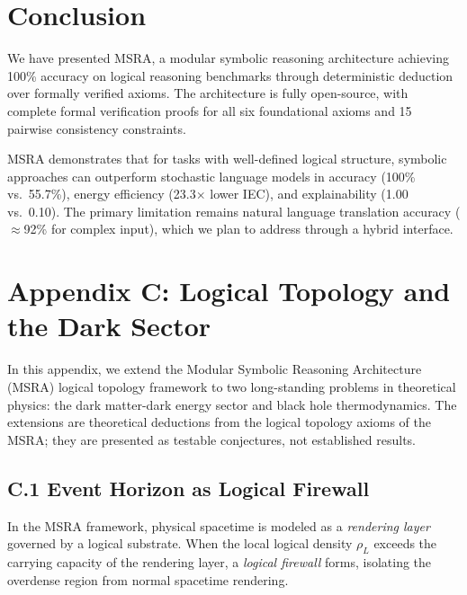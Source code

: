 \documentclass[11pt,a4paper]{article}
\begin{document}
\section{Conclusion}\label{sec:conclusion}

We have presented MSRA, a modular symbolic reasoning architecture achieving 100\% accuracy on logical reasoning benchmarks through deterministic deduction over formally verified axioms. The architecture is fully open-source, with complete formal verification proofs for all six foundational axioms and 15 pairwise consistency constraints.

MSRA demonstrates that for tasks with well-defined logical structure, symbolic approaches can outperform stochastic language models in accuracy (100\% vs.\ 55.7\%), energy efficiency (23.3$\times$ lower IEC), and explainability (1.00 vs.\ 0.10). The primary limitation remains natural language translation accuracy ($\approx$92\% for complex input), which we plan to address through a hybrid interface.

\appendix

\section*{Appendix C: Logical Topology and the Dark Sector}
\label{app:c}

In this appendix, we extend the Modular Symbolic Reasoning Architecture (MSRA) logical topology framework to two long-standing problems in theoretical physics: the dark matter-dark energy sector and black hole thermodynamics. The extensions are theoretical deductions from the logical topology axioms of the MSRA; they are presented as testable conjectures, not established results.

\subsection*{C.1 Event Horizon as Logical Firewall}

In the MSRA framework, physical spacetime is modeled as a {\it rendering layer} governed by a logical substrate. When the local logical density $\rho_L$ exceeds the carrying capacity of the rendering layer, a {\it logical firewall} forms, isolating the overdense region from normal spacetime rendering.
\end{document}

